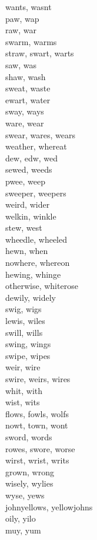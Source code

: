 wants, wasnt\\
paw, wap\\
raw, war\\
swarm, warms\\
straw, swart, warts\\
saw, was\\
shaw, wash\\
sweat, waste\\
ewart, water\\
sway, ways\\
ware, wear\\
swear, wares, wears\\
weather, whereat\\
dew, edw, wed\\
sewed, weeds\\
pwee, weep\\
sweeper, weepers\\
weird, wider\\
welkin, winkle\\
stew, west\\
wheedle, wheeled\\
hewn, when\\
nowhere, whereon\\
hewing, whinge\\
otherwise, whiterose\\
dewily, widely\\
swig, wigs\\
lewis, wiles\\
swill, wills\\
swing, wings\\
swipe, wipes\\
weir, wire\\
swire, weirs, wires\\
whit, with\\
wist, wits\\
flows, fowls, wolfs\\
nowt, town, wont\\
sword, words\\
rowes, swore, worse\\
wirst, wrist, writs\\
grown, wrong\\
wisely, wylies\\
wyse, yews\\
johnyellows, yellowjohns\\
oily, yilo\\
muy, yum\\
